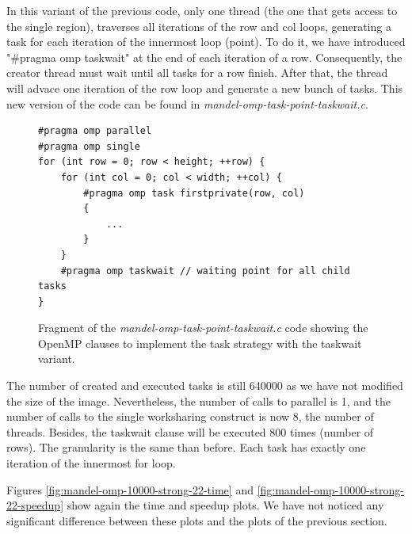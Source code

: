 \documentclass[12pt, a4paper]{article}
\begin{document}
In this variant of the previous code, only one thread (the one that gets access to the single region), traverses all iterations of the row and col loops, generating a task for each iteration of the innermost loop (point). To do it, we have introduced "\#pragma omp taskwait" at the end of each iteration of a row. Consequently, the creator thread must wait until all tasks for a row finish. After that, the thread will advace one iteration of the row loop and generate a new bunch of tasks. This new version of the code can be found in \textit{mandel-omp-task-point-taskwait.c}.

\begin{figure}[H]
\begin{lstlisting}
#pragma omp parallel
#pragma omp single
for (int row = 0; row < height; ++row) {
	for (int col = 0; col < width; ++col) {
		#pragma omp task firstprivate(row, col)
		{
			...
		}
	}
	#pragma omp taskwait // waiting point for all child tasks
}
\end{lstlisting}
\caption{Fragment of the \textit{mandel-omp-task-point-taskwait.c} code showing the OpenMP clauses to implement the task strategy with the taskwait variant.}
\label{code:task_implementation_point_taskwait}
\end{figure}

The number of created and executed tasks is still 640000 as we have not modified the size of the image. Nevertheless, the number of calls to parallel is 1, and the number of calls to the single worksharing construct is now 8, the number of threads. Besides, the taskwait clause will be executed 800 times (number of rows). The granularity is the same than before. Each task has exactly one iteration of the innermost for loop.

Figures \ref{fig:mandel-omp-10000-strong-22-time} and \ref{fig:mandel-omp-10000-strong-22-speedup} show again the time and speedup plots. We have not noticed any significant difference between these plots and the plots of the previous section.
\end{document}
